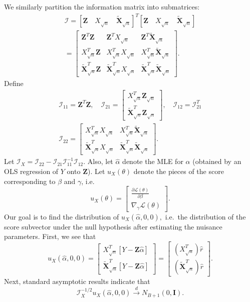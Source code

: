 \documentclass[12pt]{article}
\newcommand{\bs}[1]{\boldsymbol{#1}}
\newcommand{\infomat}{\bs{\mathcal{I}}}
\begin{document}
We similarly partition the information matrix into submatrices:
\begin{multline*}
\infomat = [\bs{Z} \quad X_{\sqrt{n}} \quad \tilde{\bs{X}}_{\sqrt{n}}]^T [\bs{Z} \quad X_{\sqrt{n}} \quad \tilde{\bs{X}}_{\sqrt{n}}] \\ = \begin{bmatrix} \bs{Z}^T\bs{Z} &\bs{Z}^T X_{\sqrt{n}} & \bs{Z}^T\tilde{\bs{X}}_{\sqrt{n}} \\ 
X_{\sqrt{n}}^T \bs{Z} & X_{\sqrt{n}}^T X_{\sqrt{n}} & X_{\sqrt{n}}^T \tilde{\bs{X}}_{\sqrt{n}} \\
\tilde{\bs{X}}^T_{\sqrt{n}} \bs{Z} & \tilde{\bs{X}}^T_{\sqrt{n}}X_{\sqrt{n}} & \tilde{\bs{X}}^T_{\sqrt{n}} \tilde{\bs{X}}_{\sqrt{n}} \end{bmatrix}.
\end{multline*}
Define 
\begin{multline*}
\infomat_{11} = \bs{Z}^T \bs{Z}, \quad \infomat_{21} = \begin{bmatrix}  X_{\sqrt{n}}^T \bs{Z}_{\sqrt{n}} \\ \tilde{\bs{X}}^T_{\sqrt{n}} \bs{Z}_{\sqrt{n}} \end{bmatrix}, \quad \infomat_{12} = \infomat_{21}^T \\ \infomat_{22} = \begin{bmatrix}  X_{\sqrt{n}}^T X_{\sqrt{n}} &  X_{\sqrt{n}}^T \tilde{\bs{X}}_{\sqrt{n}} \\  \tilde{\bs{X}}^T_{\sqrt{n}} X_{\sqrt{n}} & \tilde{\bs{X}}^T_{\sqrt{n}} \tilde{\bs{X}}_{\sqrt{n}} \end{bmatrix}.
\end{multline*}
Let $\infomat_X = \infomat_{22} - \infomat_{21}\infomat^{-1}_{11} \infomat_{12}$. Also, let $\hat{\alpha}$ denote the MLE for $\alpha$ (obtained by an OLS regression of $Y$ onto $\bs{Z}$). Let $u_X(\theta)$ denote the pieces of the score corresponding to $\beta$ and $\gamma$, i.e.\ $$u_X(\theta) = \begin{bmatrix}
\frac{\partial \mathcal{L}(\theta)}{\partial \beta} \\
\nabla_\gamma \mathcal{L}(\theta) 
\end{bmatrix}.$$ Our goal is to find the distribution of $u_X(\hat{\alpha}, 0, 0),$ i.e.\ the distribution of the score subvector under the null hypothesis after estimating the nuisance parameters. First, we see that
$$ u_X(\hat{\alpha}, 0, 0) = \begin{bmatrix} X_{\sqrt{n}}^T [Y - \bs{Z}\hat{\alpha}] \\ \tilde{\bs{X}}_{\sqrt{n}}^T [ Y - \bs{Z}\hat{\alpha}] \end{bmatrix} = \begin{bmatrix} (X^T_{\sqrt{n}}) \hat{r} \\ (\tilde{\bs{X}}^T_{\sqrt{n}})\hat{r} \end{bmatrix}.$$
Next, standard asymptotic results indicate that
$$\infomat_X^{-1/2} u_X(\hat{\alpha}, 0, 0) \xrightarrow{d} N_{B+1}(0, \bs{I}).$$
\end{document}
